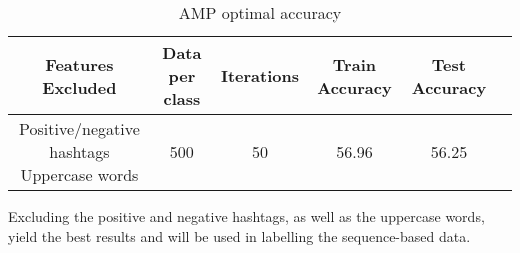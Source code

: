 \begin{table}[h!]
\begin{center}
\begin{tabular}{| c | c | c | c | c | c |}
\hline
 {\textbf{Features Excluded}} 	 
 & {\textbf{Data per class}} 					& {\textbf{Iterations}} 
 & {\textbf{Train Accuracy}} 					& {\textbf{Test Accuracy}} 
 \\
\hline
\parbox[t]{3cm}{Positive/negative hashtags \\Uppercase words}	&	500	&	50	&	56.96	& 	56.25	\\
\hline
\end{tabular}
\caption{AMP optimal accuracy}
\label{table:AMPoptimal}
\end{center}
\end{table}

Excluding the positive and negative hashtags, as well as the uppercase words, yield the best results and will be used in labelling the sequence-based data.

\begin{comment}
Tests show that some of the features are not meaningful enough and including them in the set of used features only decreases the performance. Furthermore, the Average Multiclass Perceptron was also used further in this project in a scenario where the data does not contain any hashtags. Thus, in table \ref{table:AMPfeatures}, results are shown for two different feature sets. The first one, denoted as `all', contains all features discussed in section \ref{sec:features}.
The second one, denoted in table \ref{table:AMPaccuracy} as `subset', is a subset of all features, which does not contain hashtag-related features \red{and maybe the uppercase words since ubuntu data does not contain much of them? shall we try also without it}.
\end{comment}